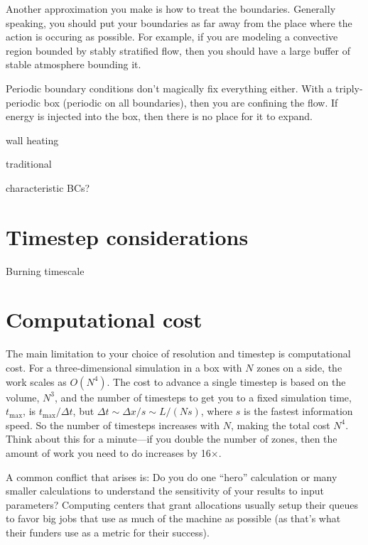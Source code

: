 Another approximation you make is how to treat the boundaries.
Generally speaking, you should put your boundaries as far away from
the place where the action is occuring as possible.  For example,
if you are modeling a convective region bounded by stably stratified
flow, then you should have a large buffer of stable atmosphere
bounding it.

Periodic boundary conditions don't magically fix everything either.  
With a triply-periodic box (periodic on all boundaries), then you 
are confining the flow.  If energy is injected into the box, then
there is no place for it to expand.  


wall heating


traditional


characteristic BCs?





\section{Timestep considerations}

Burning timescale



\section{Computational cost}

The main limitation to your choice of resolution and timestep is
computational cost.  For a three-dimensional simulation in a box with
$N$ zones on a side, the work scales as $O(N^4)$.  The cost to advance
a single timestep is based on the volume, $N^3$, and the number of
timesteps to get you to a fixed simulation time, $t_\mathrm{max}$, is
$t_\mathrm{max}/\Delta t$, but $\Delta t \sim \Delta x / s \sim L/(N
s)$, where $s$ is the fastest information speed.  So the number 
of timesteps increases with $N$, making the total cost $N^4$.
Think about this for a minute---if you double the number of zones, then
the amount of work you need to do increases by 16$\times$.

A common conflict that arises is: Do you do one ``hero'' calculation
or many smaller calculations to understand the sensitivity of your
results to input parameters?  Computing centers that grant allocations
usually setup their queues to favor big jobs that use as much of the
machine as possible (as that's what their funders use as a metric for
their success).



